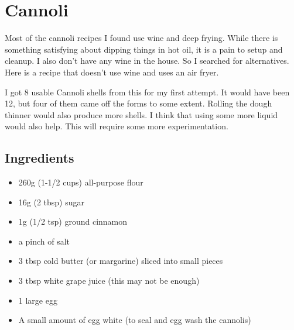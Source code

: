 \documentclass[10pt, openany]{book}
\begin{document}
\section{Cannoli}
Most of the cannoli recipes I found use wine and deep frying.  While there is something satisfying about dipping things in hot oil, it is a pain to setup and cleanup.  I also don't have any wine in the house.  So I searched for alternatives.  Here is a recipe that doesn't use wine and uses an air fryer.

I got 8 usable Cannoli shells from this for my first attempt.  It would have been 12, but four of them came off the forms to some extent.  Rolling the dough thinner would also produce more shells.  I think that using some more liquid would also help.  This will require some more experimentation.

\subsection{Ingredients}
\begin{itemize}
  \item 260g (1-1/2 cups) all-purpose flour
  \item 16g (2 tbsp) sugar
  \item 1g (1/2 tsp) ground cinnamon
  \item a pinch of salt
  \item 3 tbsp cold butter (or margarine) sliced into small pieces
  \item 3 tbsp white grape juice (this may not be enough)
  \item 1 large egg
  \item A small amount of egg white (to seal and egg wash the cannolis)
\end{itemize}
\end{document}
